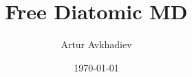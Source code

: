 \documentclass[%
    preprint,
    longbibliography,
    bibnotes,
     amsmath,amssymb,
     aps,
    ]{revtex4-1}
\numberwithin{equation}{section}
\begin{document}
\lstset{language=Python}     			%
\title{Free Diatomic MD}
\author{Artur Avkhadiev}
\date{\today}
\begin{abstract}  
\end{abstract}
\maketitle



%						
\nocite{*}


\end{document}
